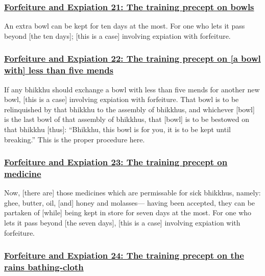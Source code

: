 \subsubsection*{\hyperref[np21]{Forfeiture and Expiation 21: The training precept on bowls}}
\label{forf-exp21}

An extra bowl can be kept for ten days at the most. For one who lets it pass beyond [the ten days]; [this is a case] involving expiation with forfeiture.



\subsubsection*{\hyperref[np22]{Forfeiture and Expiation 22: The training precept on [a bowl with] less than five mends}}
\label{forf-exp22}

If any bhikkhu should exchange a bowl with less than five mends for another new bowl, [this is a case] involving expiation with forfeiture. That bowl is to be relinquished by that bhikkhu to the assembly of bhikkhus, and whichever [bowl] is the last bowl of that assembly of bhikkhus, that [bowl] is to be bestowed on that bhikkhu [thus]: ``Bhikkhu, this bowl is for you, it is to be kept until breaking.'' This is the proper procedure here.



\subsubsection*{\hyperref[np23]{Forfeiture and Expiation 23: The training precept on medicine}}
\label{forf-exp23}

Now, [there are] those medicines which are permissable for sick bhikkhus, namely: ghee, butter, oil, [and] honey and molasses— having been accepted, they can be partaken of [while] being kept in store for seven days at the most. For one who lets it pass beyond [the seven days], [this is a case] involving expiation with forfeiture.



\subsubsection*{\hyperref[np24]{Forfeiture and Expiation 24: The training precept on the rains bathing-cloth}}
\label{forf-exp24}


